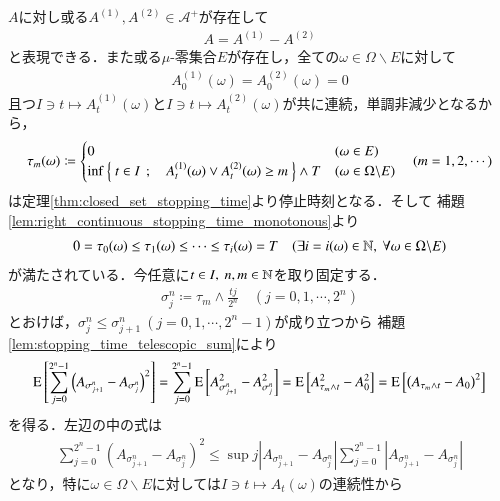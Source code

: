 	\begin{prf}
		$A$に対し或る$A^{(1)},A^{(2)} \in \mathcal{A}^+$が存在して
		\begin{align}
			A = A^{(1)} - A^{(2)}
		\end{align}
		と表現できる．また或る$\mu$-零集合$E$が存在し，全ての$\omega \in \Omega \backslash E$に対して
		\begin{align}
			A_0^{(1)}(\omega) = A_0^{(2)}(\omega) = 0
		\end{align}
		且つ$I \ni t \longmapsto A_t^{(1)}(\omega)$と$I \ni t \longmapsto A_t^{(2)}(\omega)$が共に連続，単調非減少となるから，
		\begin{align}
			\tau_m(\omega) \coloneqq
			\begin{cases}
				0 & (\omega \in E) \\
				\operatorname*{inf}_{} \left\{\ t \in I\ \, ; \quad A_t^{(1)}(\omega) \vee A_t^{(2)}(\omega) \geq m\ \right\} \wedge T & (\omega \in \Omega \backslash E)
			\end{cases}
			\quad (m=1,2,\cdots)
		\end{align}
		は定理\ref{thm:closed_set_stopping_time}より停止時刻となる．そして
		補題\ref{lem:right_continuous_stopping_time_monotonous}より
		\begin{align}
			0 = \tau_0(\omega) \leq \tau_1(\omega) \leq \cdots \leq \tau_i(\omega) = T \quad (\exists i = i(\omega) \in \mathbb{N},\ \forall \omega \in \Omega \backslash E)
		\end{align}
		が満たされている．今任意に$t \in I,\ n,m \in \mathbb{N}$を取り固定する．
		\begin{align}
			\sigma_j^n \coloneqq \tau_m \wedge \frac{tj}{2^n} \quad (j = 0,1,\cdots, 2^n)
		\end{align}
		とおけば，$\sigma_j^n \leq \sigma_{j+1}^n\ (j = 0,1,\cdots, 2^n-1)$が成り立つから
		補題\ref{lem:stopping_time_telescopic_sum}により
		\begin{align}
			\operatorname{E} \left[ \sum_{j=0}^{2^n-1} \left( A_{\sigma_{j+1}^n} - A_{\sigma_j^n} \right)^2 \right]
			= \sum_{j=0}^{2^n-1} \operatorname{E} \left[ A_{\sigma_{j+1}^n}^2 - A_{\sigma_j^n}^2 \right]
			= \operatorname{E} \left[ A_{\tau_m \wedge t}^2 - A_{0}^2 \right]
			= \operatorname{E} \left[ \left( A_{\tau_m \wedge t} - A_{0} \right)^2 \right]
		\end{align}
		を得る．左辺の中の式は
		\begin{align}
			\sum_{j=0}^{2^n-1} \left( A_{\sigma_{j+1}^n} - A_{\sigma_j^n} \right)^2
			\leq \sup{j}{\left| A_{\sigma_{j+1}^n} - A_{\sigma_j^n} \right|} \sum_{j=0}^{2^n-1} \left| A_{\sigma_{j+1}^n} - A_{\sigma_j^n} \right|
		\end{align}
		となり，特に$\omega \in \Omega \backslash E$に対しては$I \ni t \longmapsto A_t(\omega)$の連続性から

\end{prf}
